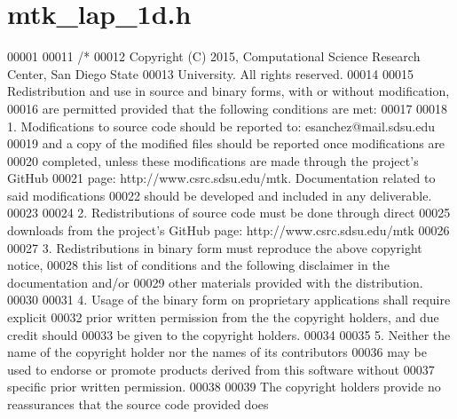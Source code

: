 \hypertarget{mtk__lap__1d_8h_source}{\section{mtk\+\_\+lap\+\_\+1d.\+h}
\label{mtk__lap__1d_8h_source}
}

\begin{DoxyCode}
00001 
00011 \textcolor{comment}{/*}
00012 \textcolor{comment}{Copyright (C) 2015, Computational Science Research Center, San Diego State}
00013 \textcolor{comment}{University. All rights reserved.}
00014 \textcolor{comment}{}
00015 \textcolor{comment}{Redistribution and use in source and binary forms, with or without modification,}
00016 \textcolor{comment}{are permitted provided that the following conditions are met:}
00017 \textcolor{comment}{}
00018 \textcolor{comment}{1. Modifications to source code should be reported to: esanchez@mail.sdsu.edu}
00019 \textcolor{comment}{and a copy of the modified files should be reported once modifications are}
00020 \textcolor{comment}{completed, unless these modifications are made through the project's GitHub}
00021 \textcolor{comment}{page: http://www.csrc.sdsu.edu/mtk. Documentation related to said modifications}
00022 \textcolor{comment}{should be developed and included in any deliverable.}
00023 \textcolor{comment}{}
00024 \textcolor{comment}{2. Redistributions of source code must be done through direct}
00025 \textcolor{comment}{downloads from the project's GitHub page: http://www.csrc.sdsu.edu/mtk}
00026 \textcolor{comment}{}
00027 \textcolor{comment}{3. Redistributions in binary form must reproduce the above copyright notice,}
00028 \textcolor{comment}{this list of conditions and the following disclaimer in the documentation and/or}
00029 \textcolor{comment}{other materials provided with the distribution.}
00030 \textcolor{comment}{}
00031 \textcolor{comment}{4. Usage of the binary form on proprietary applications shall require explicit}
00032 \textcolor{comment}{prior written permission from the the copyright holders, and due credit should}
00033 \textcolor{comment}{be given to the copyright holders.}
00034 \textcolor{comment}{}
00035 \textcolor{comment}{5. Neither the name of the copyright holder nor the names of its contributors}
00036 \textcolor{comment}{may be used to endorse or promote products derived from this software without}
00037 \textcolor{comment}{specific prior written permission.}
00038 \textcolor{comment}{}
00039 \textcolor{comment}{The copyright holders provide no reassurances that the source code provided does}

\end{DoxyCode}
